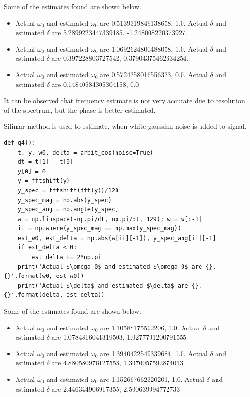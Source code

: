 \documentclass[12pt, a4paper]{article}
\begin{document}
Some of the estimates found are shown below.

\begin{itemize}
\item Actual $\omega_0$ and estimated $\omega_0$ are 0.5139319849138658, 1.0. Actual $\delta$ and estimated $\delta$ are 5.2899223447339185, -1.248008220373927.
\item Actual $\omega_0$ and estimated $\omega_0$ are 1.0692624800488058, 1.0. Actual $\delta$ and estimated $\delta$ are 0.397228803727542, 0.37904375462634254.
\item Actual $\omega_0$ and estimated $\omega_0$ are 0.5724358016556333, 0.0.
Actual $\delta$ and estimated $\delta$ are 0.14840584305304158, 0.0
\end{itemize}

It can be observed that frequency estimate is not very accurate due to resolution of the spectrum, but the phase is better estimated.

Silimar method is used to estimate, when white gaussian noise is added to signal.

\begin{lstlisting}
def q4():
    t, y, w0, delta = arbit_cos(noise=True)
    dt = t[1] - t[0]
    y[0] = 0
    y = fftshift(y)
    y_spec = fftshift(fft(y))/128
    y_spec_mag = np.abs(y_spec)
    y_spec_ang = np.angle(y_spec)
    w = np.linspace(-np.pi/dt, np.pi/dt, 129); w = w[:-1]
    ii = np.where(y_spec_mag == np.max(y_spec_mag))
    est_w0, est_delta = np.abs(w[ii][-1]), y_spec_ang[ii][-1]
    if est_delta < 0:
        est_delta += 2*np.pi
    print('Actual $\omega_0$ and estimated $\omega_0$ are {}, {}'.format(w0, est_w0))
    print('Actual $\delta$ and estimated $\delta$ are {}, {}'.format(delta, est_delta))
\end{lstlisting}

Some of the estimates found are shown below.

\begin{itemize}
\item Actual $\omega_0$ and estimated $\omega_0$ are 1.10588175592206, 1.0.
Actual $\delta$ and estimated $\delta$ are 1.0784816041319503, 1.0277791200791555
\item Actual $\omega_0$ and estimated $\omega_0$ are 1.3940422549339684, 1.0.
Actual $\delta$ and estimated $\delta$ are 4.880580976127553, 1.3076057592874013
\item Actual $\omega_0$ and estimated $\omega_0$ are 1.152667662320201, 1.0.
Actual $\delta$ and estimated $\delta$ are 2.446344906917355, 2.500639994772733
\end{itemize}
\end{document}
